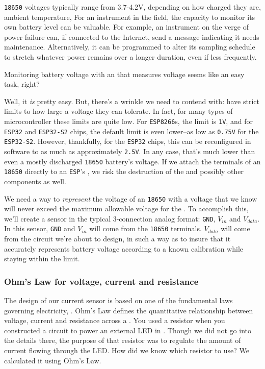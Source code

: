 \texttt{18650} voltages typically range from 3.7-4.2V, depending on how charged they are, ambient temperature, \etc
For an instrument in the field, the capacity to monitor its own battery level can be valuable.
For example, an instrument on the verge of power failure can, if connected to the Internet, send a message indicating it needs maintenance.
Alternatively, it can be programmed to alter its sampling schedule to stretch whatever power remains over a longer duration, even if less frequently.

Monitoring battery voltage with an \adc that measures voltage seems like an easy task, right?

Well, it \emph{is} pretty easy.
But, there's a wrinkle we need to contend with: \adcs have strict limits to how large a voltage they can tolerate.
In fact, for many types of microcontroller these limits are quite low.
For \texttt{ESP8266}s, the limit is \texttt{1V}, and for \texttt{ESP32} and \texttt{ESP32-S2} chips, the default limit is even lower--as low as \texttt{0.75V} for the \texttt{ESP32-S2}.  However, thankfully, for the \texttt{ESP32} chips, this can be reconfigured in software to as much as approximately \texttt{2.5V}.
In any case, that's much lower than even a mostly discharged \texttt{18650} battery's voltage.
If we attach the terminals of an \texttt{18650} directly to an \texttt{ESP}'s \adc, we risk the destruction of the \adc and possibly other components as well.

We need a way to \emph{represent} the voltage of an \texttt{18650} with a voltage that we know will never exceed the maximum allowable voltage for the \adc.
To accomplish this, we'll create a sensor in the typical 3-connection analog format: \texttt{GND}, $V_{in}$ and $V_{data}$.
In this sensor, \texttt{GND} and $V_{in}$ will come from the \texttt{18650} terminals.
$V_{data}$ will come from the circuit we're about to design, in such a way as to insure that it accurately represents battery voltage according to a known calibration while staying within the limit.

\subsubsection{Ohm's Law for voltage, current and resistance}
The design of our current sensor is based on one of the fundamental laws governing electricity, .
Ohm's Law defines the quantitative relationship between voltage, current and resistance across a .
You used a resistor when you constructed a circuit to power an external LED in .
Though we did not go into the details there, the purpose of that resistor was to regulate the amount of current flowing through the LED.
How did we know which resistor to use?
We calculated it using Ohm's Law.

